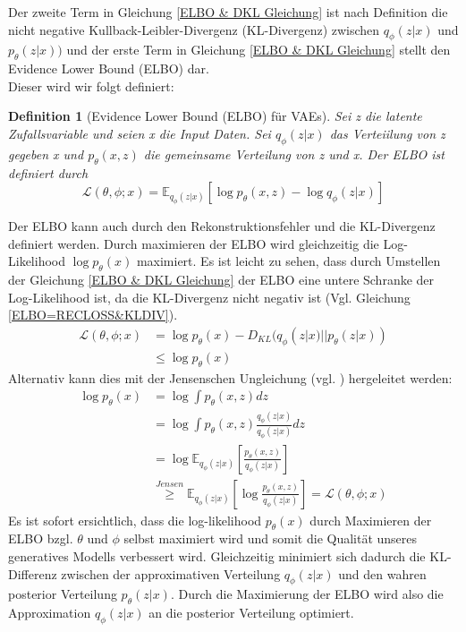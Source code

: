 \documentclass[%
thesis=student,%
coverpage=false,%
titlepage=false,%
headmarks=true, %
german,%
font=libertine, %
math=newpxtx, %
BCOR=5mm,%
coverBCOR=11mm%
]{tumbook}
\theoremstyle{break}
\newtheorem{definition}{Definition}[section]
\begin{document}
Der zweite Term in Gleichung \ref{ELBO & DKL Gleichung} ist nach Definition die nicht negative Kullback-Leibler-Divergenz (KL-Divergenz) zwischen $q_\phi(z|x)$ und $p_\theta(z|x))$ und der erste Term in Gleichung \ref{ELBO & DKL Gleichung} stellt den Evidence Lower Bound (ELBO) dar.\\
Dieser wird wir folgt definiert:\\
\begin{definition}[Evidence Lower Bound (ELBO) für VAEs]
	Sei z die latente Zufallsvariable und seien x die Input Daten.
	Sei $q_\phi(z|x)$ das Verteiilung von z gegeben x und $p_\theta(x,z)$ die gemeinsame Verteilung von z und x. Der ELBO ist definiert durch
	$$ \mathcal{L}(\theta,\phi;x) = \mathbb{E}_{q_\phi(z|x)}[\log p_\theta(x,z) - \log q_\phi(z|x)] $$ 
\end{definition}\noindent
Der ELBO kann auch durch den Rekonstruktionsfehler und die KL-Divergenz definiert werden.
Durch maximieren der ELBO wird gleichzeitig die Log-Likelihood $\log p_\theta(x)$ maximiert. 
Es ist leicht zu sehen, dass durch Umstellen der Gleichung \ref{ELBO & DKL Gleichung} der ELBO eine untere Schranke der Log-Likelihood ist, da die KL-Divergenz nicht negativ ist (Vgl. Gleichung \ref{ELBO=RECLOSS&KLDIV}).
\begin{align}
	\mathcal{L}(\theta,\phi;x) &= \log p_\theta(x) - D_{KL}(q_\phi(z|x)||p_\theta(z|x)) \label{ELBO=RECLOSS&KLDIV}\\
	&\leq 	\log p_\theta(x) 
\end{align}\noindent
Alternativ kann dies mit der Jensenschen Ungleichung (vgl. \cite{JensenscheUngleichung}) hergeleitet werden:
\begin{align}
	\log p_\theta(x) &= \log \int p_\theta(x,z) dz \\
	&= \log \int p_\theta(x,z) \frac{q_\phi(z|x)}{q_\phi(z|x)} dz \\
	& = \log \mathbb{E}_{q_\phi(z|x)}\left[\frac{p_\theta(x,z)}{q_\phi(z|x)}\right] \\
	& \overset{Jensen}{\geq} \mathbb{E}_{q_\phi(z|x)}\left[\log \frac{p_\theta(x,z)}{q_\phi(z|x)}\right] = \mathcal{L}(\theta,\phi;x)
\end{align}\noindent
Es ist sofort ersichtlich, dass die log-likelihood $p_\theta(x)$ durch Maximieren der ELBO bzgl. $\theta$ und  $\phi$ selbst maximiert wird und somit die Qualität unseres generatives Modells verbessert wird. Gleichzeitig minimiert sich dadurch die KL-Differenz zwischen der approximativen Verteilung $q_\phi(z|x)$ und den wahren posterior Verteilung $p_\theta(z|x)$. Durch die Maximierung der ELBO wird also die Approximation $q_\phi(z|x)$ an die posterior Verteilung optimiert. \\
\end{document}
